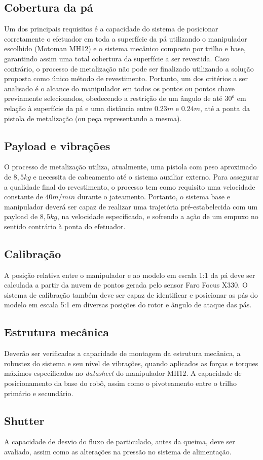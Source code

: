 \subsection{Cobertura da pá}
Um dos principais requisitos é a capacidade do sistema de posicionar
corretamente o efetuador em toda a superfície da pá utilizando o manipulador
escolhido (Motoman MH12) e o sistema mecânico composto por trilho e base,
garantindo assim uma total cobertura da superfície a ser revestida.
Caso contrário, o processo de metalização não pode ser finalizado
utilizando a solução proposta como único método de
revestimento. Portanto, um dos critérios a ser analisado é o alcance do
manipulador em todos os pontos ou pontos chave previamente selecionados,
obedecendo a restrição de um ângulo de até $30^o$  em
relação à superfície da pá e uma distância entre $0.23m$ e $0.24m$, até a ponta
da pistola de metalização (ou peça representando a mesma).

\subsection{Payload e vibrações}
O processo de metalização utiliza, atualmente, uma pistola com peso aproximado
de $8,5kg$ e necessita de cabeamento até o sistema auxiliar externo.
Para assegurar a qualidade final do revestimento, o processo tem como requisito
uma velocidade constante de $40m/min$ durante o jateamento. 
Portanto, o sistema base e manipulador deverá ser capaz de realizar uma
trajetória pré-estabelecida com um payload de $8,5kg$, na velocidade
especificada, e sofrendo a ação de um empuxo no sentido contrário à ponta do efetuador.

\subsection{Calibração}
A posição relativa entre o manipulador e ao modelo em escala 1:1 da pá deve ser
calculada a partir da nuvem de pontos gerada pelo sensor Faro Focus X330. 
O sistema de calibração também deve ser capaz de identificar e posicionar as pás
do modelo em escala 5:1 em diversas posições do rotor e ângulo de ataque das
pás.

\subsection{Estrutura mecânica}
Deverão ser verificadas a capacidade de montagem da estrutura mecânica, a
robustez do sistema e seu nível de vibrações, quando aplicados as forças
e torques máximos especificados no \textit{datasheet} do manipulador MH12.
A capacidade de posicionamento da base do robô, assim como o pivoteamento entre
o trilho primário e secundário.

\subsection{Shutter}

A capacidade de desvio do fluxo de particulado, antes da queima, deve ser
avaliado, assim como as alterações na pressão no sistema de alimentação.



